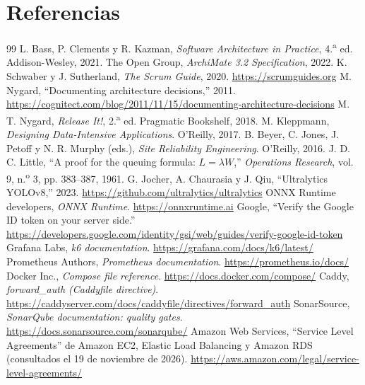 \section{Referencias}
\begin{thebibliography}{99}
 L. Bass, P. Clements y R. Kazman, \emph{Software Architecture in Practice}, 4.\textsuperscript{a} ed. Addison-Wesley, 2021.
 The Open Group, \emph{ArchiMate 3.2 Specification}, 2022.
 K. Schwaber y J. Sutherland, \emph{The Scrum Guide}, 2020. \url{https://scrumguides.org}
 M. Nygard, ``Documenting architecture decisions,'' 2011. \url{https://cognitect.com/blog/2011/11/15/documenting-architecture-decisions}
 M. T. Nygard, \emph{Release It!}, 2.\textsuperscript{a} ed. Pragmatic Bookshelf, 2018.
 M. Kleppmann, \emph{Designing Data-Intensive Applications}. O'Reilly, 2017.
 B. Beyer, C. Jones, J. Petoff y N. R. Murphy (eds.), \emph{Site Reliability Engineering}. O'Reilly, 2016.
 J. D. C. Little, ``A proof for the queuing formula: $L=\lambda W$,'' \emph{Operations Research}, vol. 9, n.\textsuperscript{o} 3, pp. 383--387, 1961.
 G. Jocher, A. Chaurasia y J. Qiu, ``Ultralytics YOLOv8,'' 2023. \url{https://github.com/ultralytics/ultralytics}
 ONNX Runtime developers, \emph{ONNX Runtime}. \url{https://onnxruntime.ai}
 Google, ``Verify the Google ID token on your server side.'' \url{https://developers.google.com/identity/gsi/web/guides/verify-google-id-token}
 Grafana Labs, \emph{k6 documentation}. \url{https://grafana.com/docs/k6/latest/}
 Prometheus Authors, \emph{Prometheus documentation}. \url{https://prometheus.io/docs/}
 Docker Inc., \emph{Compose file reference}. \url{https://docs.docker.com/compose/}
 Caddy, \emph{forward\_auth (Caddyfile directive)}. \url{https://caddyserver.com/docs/caddyfile/directives/forward_auth}
 SonarSource, \emph{SonarQube documentation: quality gates}. \url{https://docs.sonarsource.com/sonarqube/}
 Amazon Web Services, ``Service Level Agreements'' de Amazon EC2, Elastic Load Balancing y Amazon RDS (consultados el 19 de noviembre de 2026). \url{https://aws.amazon.com/legal/service-level-agreements/}
\end{thebibliography}

